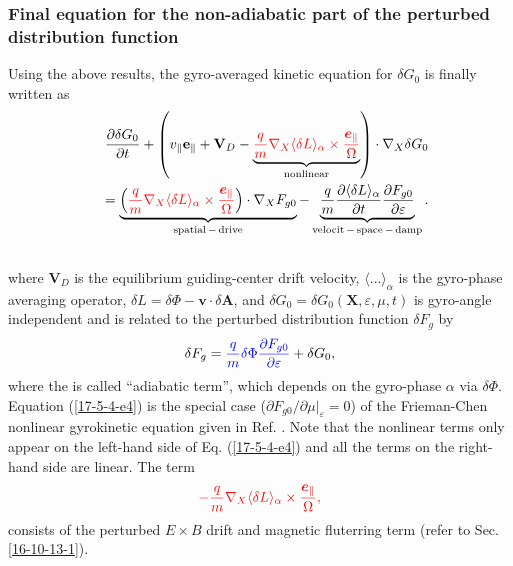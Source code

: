 \documentclass{llncs}
\newcommand{\nobracket}{}
\newcommand{\tmcolor}[2]{{\color{#1}{#2}}}
\newcommand{\tmmathbf}[1]{\ensuremath{\boldsymbol{#1}}}
\newcommand{\tmop}[1]{\ensuremath{\operatorname{#1}}}
\begin{document}
\subsubsection{Final equation for the non-adiabatic part of the perturbed
distribution function}

Using the above results, the gyro-averaged kinetic equation for $\delta G_0$
is finally written as
\begin{eqnarray}
  &  & \frac{\partial \delta G_0}{\partial t} + \left( v_{\parallel}
  \mathbf{e}_{\parallel} +\mathbf{V}_D - \underbrace{\tmcolor{red}{\frac{q}{m}
  \nabla_X \langle \delta L \rangle_{\alpha} \times
  \frac{\tmmathbf{e}_{\parallel}}{\Omega}}}_{\tmop{nonlinear}} \right) \cdot
  \nabla_X \delta G_0 \nonumber\\
  &  & = \underbrace{\left( \tmcolor{red}{\frac{q}{m} \nabla_X \langle \delta
  L \rangle_{\alpha} \times \frac{\tmmathbf{e}_{\parallel}}{\Omega}} \right)
  \cdot \nabla_X F_{g 0}}_{\tmop{spatial} - \tmop{drive}} -
  \underbrace{\frac{q}{m}  \frac{\partial \langle \delta L
  \rangle_{\alpha}}{\partial t}  \frac{\partial F_{g 0}}{\partial
  \varepsilon}}_{\tmop{velocit} - \tmop{space} - \tmop{damp}} . 
  \label{17-5-4-e4}\\
  &  &  \nonumber
\end{eqnarray}
where $\mathbf{V}_D$ is the equilibrium guiding-center drift velocity,
$\langle \ldots \rangle_{\alpha}$ is the gyro-phase averaging operator,
$\delta L = \delta \Phi -\mathbf{v} \cdot \delta \mathbf{A}$, and $\delta G_0
= \delta G_0 (\mathbf{X}, \varepsilon, \mu, t)$ is gyro-angle independent and
is related to the perturbed distribution function $\delta F_g$ by
\begin{equation}
  \delta F_g = \tmcolor{blue}{\frac{q}{m} \delta \Phi \frac{\partial F_{g
  0}}{\partial \varepsilon}} + \delta G_0,
\end{equation}
where the \tmcolor{blue}{first term} is called ``adiabatic term'', which
depends on the gyro-phase $\alpha$ via $\delta \Phi$. Equation
(\ref{17-5-4-e4}) is the special case ($\partial F_{g 0} / \partial \mu
|_{\varepsilon} \nobracket = 0$) of the Frieman-Chen nonlinear gyrokinetic
equation given in Ref. {\cite{frieman1982}}. Note that the nonlinear terms
only appear on the left-hand side of Eq. (\ref{17-5-4-e4}) and all the terms
on the right-hand side are linear. The term
\begin{equation}
  \tmcolor{red}{- \frac{q}{m} \nabla_X \langle \delta L \rangle_{\alpha}
  \times \frac{\tmmathbf{e}_{\parallel}}{\Omega},}
\end{equation}
consists of the perturbed $E \times B$ drift and magnetic fluterring term
(refer to Sec. \ref{16-10-13-1}).
\end{document}
